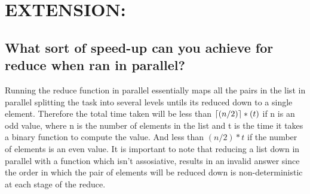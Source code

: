 \documentclass[a4paper]{article}
\DeclarePairedDelimiter\ceil{\lceil}{\rceil}
\theoremstyle{definition}
\begin{document}
\section{EXTENSION:}
\subsection{What sort of speed-up can you achieve for reduce when ran in parallel?}
Running the reduce function in parallel essentially maps all the pairs in the list in parallel splitting the task into several levels untils its reduced down to a single element. Therefore the total time taken will be less than $\ceil{(n/2)}*(t)$ if n is an odd value, where n is the number of elements in the list and t is the time it takes a binary function to compute the value. And less than $(n/2)*t$ if the number of elements is an even value. It is important to note that reducing a list down in parallel with a function which isn't assosiative, results in an invalid answer since the order in which the pair of elements will be reduced down is non-deterministic at each stage of the reduce.
\end{document}
